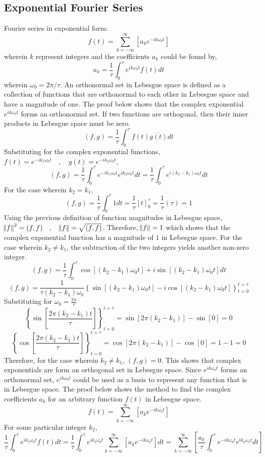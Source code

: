 \documentclass[a4paper, 12pt]{report}
\def\w{\omega}
\def\f{\frac}
\def\l{\left}
\def\r{\right}
\def\dst{\displaystyle}
\begin{document}
\begin{center}
\subsection{Exponential Fourier Series}
Fourier series in exponential form:
$$f(t) = \sum^{\infty}_{k = -\infty}\l[a_ke^{-ik\w_0t}\r]$$
wherein $k$ represent integers and the coefficients $a_k$ could be found by,
$$a_k = \f{1}{\tau}\int^{\tau}_{0}e^{ik\w_0t}f(t)dt$$
wherein $\w_0 = 2\pi/\tau$. An orthonormal set in Lebesgue space is defined as a collection of functions that are orthonormal to each other in Lebesgue space and have a magnitude of one. The proof below shows that the complex exponential $e^{ik\w_0t}$ forms an orthonormal set. If two functions are orthogonal, then their inner products in Lebesgue space must be zero.
$$(f,g) = \f{1}{\tau}\int^{\tau}_{0}f(t)\overline{g(t)}dt$$
Substituting for the complex exponential functions, $f(t) = e^{-ik_1\w_0t}\quad,\quad g(t) = e^{-ik_2\w_0t}$,
$$(f,g) = \f{1}{\tau}\int^{\tau}_{0}e^{-ik_1\w_0t} e^{ik_2\w_0t}dt = \f{1}{\tau}\int^{\tau}_{0}e^{i(k_2-k_1)\w_0t}dt$$
For the case wherein $k_2 = k_1$, 
$$(f,g) = \f{1}{\tau}\int^{\tau}_{0}1dt = \f{1}{\tau} \l[t\r]^{\tau}_{0} = \f{1}{\tau}(\tau) = 1$$
Using the previous definition of function magnitudes in Lebesgue space, $\norm{f}^2 = (f,f)\quad,\quad\norm{f} = \sqrt{(f,f)}$. Therefore, $\norm{f} = 1$ which shows that the complex exponential function has a magnitude of $1$ in Lebesgue space. For the case wherein $k_2 \neq k_1$, the subtraction of the two integers yields another non-zero integer.
$$(f,g) = \f{1}{\tau}\int^{\tau}_{0} \cos\l[(k_2-k_1)\w_0t\r] + i\sin\l[(k_2-k_1)\w_0t\r]dt$$
$$(f,g) = \f{1}{\tau(k_2-k_1)\w_0}\l\{\sin\l[(k_2-k_1)\w_0t\r] - i\cos\l[(k_2-k_1)\w_0t\r]\r\}^{t = \tau}_{t = 0}$$
Substituting for $\dst{\w_0 = \f{2\pi}{\tau}}$ 
$$\l\{\sin\l[\f{2\pi(k_2-k_1)t}{\tau}\r]\r\}^{t = \tau}_{t = 0} = \sin\l[2\pi(k_2-k_1)\r] - \sin\l[0\r] = 0$$
$$\l\{\cos\l[\f{2\pi(k_2-k_1)t}{\tau}\r]\r\}^{t = \tau}_{t = 0} = \cos\l[2\pi(k_2-k_1)\r] - \cos\l[0\r] = 1 - 1 = 0$$
Therefore, for the case wherein $k_2 \neq k_1$, $(f,g) = 0$. This shows that complex exponentials are form an orthogonal set in Lebesgue space. Since $e^{ik\w_0t}$ forms an orthonormal set, $e^{ik\w_0t}$ could be used as a basis to represent any function that is in Lebesgue space. The proof below shows the method to find the complex coefficients $a_k$ for an arbitrary function $f(t)$ in Lebesgue space.
$$f(t) = \sum^{\infty}_{k = -\infty}\l[a_ke^{-ik\w_0t}\r]$$
For some particular integer $k_2$,
$$\f{1}{\tau}\int^{\tau}_{0}e^{ik_2\w_0t}f(t)dt= \f{1}{\tau}\int^{\tau}_{0}e^{ik_2\w_0t}\sum^{\infty}_{k = -\infty}\l[a_ke^{-ik\w_0t}\r]dt = \sum^{\infty}_{k = -\infty}\l[\f{a_k}{\tau}\int^{\tau}_{0}e^{-ik\w_0t}e^{ik_2\w_0t}dt\r]$$

\end{center}
\end{document}
